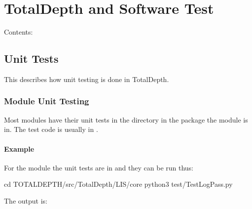 \documentclass[letterpaper,10pt,english]{sphinxmanual}
\begin{document}
\section{TotalDepth and Software Test}
\label{\detokenize{testing/index_test:totaldepth-and-software-test}}\label{\detokenize{testing/index_test::doc}}
Contents:


\subsection{Unit Tests}
\label{\detokenize{testing/unit_tests::doc}}\label{\detokenize{testing/unit_tests:unit-tests}}
This describes how unit testing is done in TotalDepth.


\subsubsection{Module Unit Testing}
\label{\detokenize{testing/unit_tests:module-unit-testing}}
Most modules have their unit tests in the  directory in the package the module is in.
The test code is usually in .


\paragraph{Example}
\label{\detokenize{testing/unit_tests:example}}
For the module  the unit tests are in 
and they can be run thus:

\begin{sphinxVerbatim}[commandchars=\\\{\}]
\PYGZdl{} cd \PYGZlt{}TOTALDEPTH\PYGZgt{}/src/TotalDepth/LIS/core
\PYGZdl{} python3 test/TestLogPass.py
\end{sphinxVerbatim}

The output is:
\end{document}
